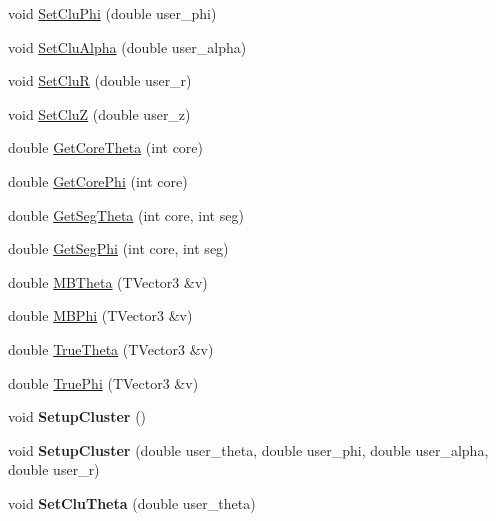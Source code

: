 \begin{DoxyCompactItemize}
\item 
void \hyperlink{class_m_b_geometry_a74142f84cf6317d52ae39c0e0ff8a87e}{Set\+Clu\+Phi} (double user\+\_\+phi)
\item 
void \hyperlink{class_m_b_geometry_a0d4868b0360a6e5534918a9813540015}{Set\+Clu\+Alpha} (double user\+\_\+alpha)
\item 
void \hyperlink{class_m_b_geometry_a292c4326421c78871667e91c3694ae35}{Set\+CluR} (double user\+\_\+r)
\item 
void \hyperlink{class_m_b_geometry_aa6b9d54c7157e8c65e2b208fcef8222c}{Set\+CluZ} (double user\+\_\+z)
\item 
double \hyperlink{class_m_b_geometry_a42aa536f15017724812712b0f8a77c12}{Get\+Core\+Theta} (int core)
\item 
double \hyperlink{class_m_b_geometry_a39f685610ae0e68e547a46f8ef992599}{Get\+Core\+Phi} (int core)
\item 
double \hyperlink{class_m_b_geometry_a49cdf742a2902fc85f0b24dfffa554a8}{Get\+Seg\+Theta} (int core, int seg)
\item 
double \hyperlink{class_m_b_geometry_a575ddd6022d2d686a83ebce3195b6c50}{Get\+Seg\+Phi} (int core, int seg)
\item 
double \hyperlink{class_m_b_geometry_af4adfb858000405b21f79a6bf10c3c37}{M\+B\+Theta} (T\+Vector3 \&v)
\item 
double \hyperlink{class_m_b_geometry_a399568d67bb83801ef6a2dbe963a535e}{M\+B\+Phi} (T\+Vector3 \&v)
\item 
double \hyperlink{class_m_b_geometry_afd393f9db7182de7fb19f0c934edb383}{True\+Theta} (T\+Vector3 \&v)
\item 
double \hyperlink{class_m_b_geometry_a718d9c7fcc4a5fb8b9ecaabdc7a0503f}{True\+Phi} (T\+Vector3 \&v)
\item 
\mbox{\label{class_m_b_geometry_a4d98a38f0dc1ca6a4a73477dde5cdd8d}} 
void {\bfseries Setup\+Cluster} ()
\item 
\mbox{\label{class_m_b_geometry_a93f157cebad3f63dbbefb5b08f3555af}} 
void {\bfseries Setup\+Cluster} (double user\+\_\+theta, double user\+\_\+phi, double user\+\_\+alpha, double user\+\_\+r)
\item 
\mbox{\label{class_m_b_geometry_a9a2a8c9609141be92d7ba30e6087aa30}} 
void {\bfseries Set\+Clu\+Theta} (double user\+\_\+theta)
\item 

\end{DoxyCompactItemize}

